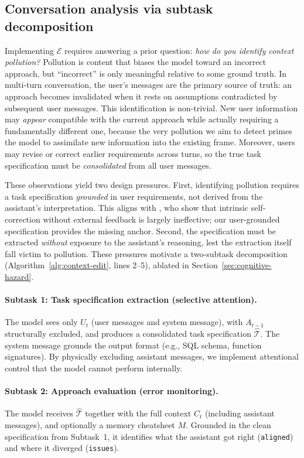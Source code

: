 \documentclass{article}
\begin{document}
\subsection{Conversation analysis via subtask decomposition}
\label{sec:decomposition}

Implementing $\mathcal{E}$ requires answering a prior question: \emph{how do you identify context pollution?} Pollution is content that biases the model toward an incorrect approach, but ``incorrect'' is only meaningful relative to some ground truth. In multi-turn conversation, the user's messages are the primary source of truth: an approach becomes invalidated when it rests on assumptions contradicted by subsequent user messages. This identification is non-trivial. New user information may \emph{appear} compatible with the current approach while actually requiring a fundamentally different one, because the very pollution we aim to detect primes the model to assimilate new information into the existing frame. Moreover, users may revise or correct earlier requirements across turns, so the true task specification must be \emph{consolidated} from all user messages.

These observations yield two design pressures. First, identifying pollution requires a task specification \emph{grounded} in user requirements, not derived from the assistant's interpretation. This aligns with \citet{kamoi2024criticalselfcorrect}, who show that intrinsic self-correction without external feedback is largely ineffective; our user-grounded specification provides the missing anchor. Second, the specification must be extracted \emph{without} exposure to the assistant's reasoning, lest the extraction itself fall victim to pollution. These pressures motivate a two-subtask decomposition (Algorithm~\ref{alg:context-edit}, lines 2--5), ablated in Section~\ref{sec:cognitive-hazard}.

\paragraph{Subtask 1: Task specification extraction (selective attention).}
The model sees only $U_t$ (user messages and system message), with $A_{t-1}$ structurally excluded, and produces a consolidated task specification $\hat{\mathcal{T}}$. The system message grounds the output format (e.g., SQL schema, function signatures). By physically excluding assistant messages, we implement attentional control that the model cannot perform internally.

\paragraph{Subtask 2: Approach evaluation (error monitoring).}
The model receives $\hat{\mathcal{T}}$ together with the full context $C_t$ (including assistant messages), and optionally a memory cheatsheet $M$. Grounded in the clean specification from Subtask~1, it identifies what the assistant got right (\texttt{aligned}) and where it diverged (\texttt{issues}).
\end{document}
